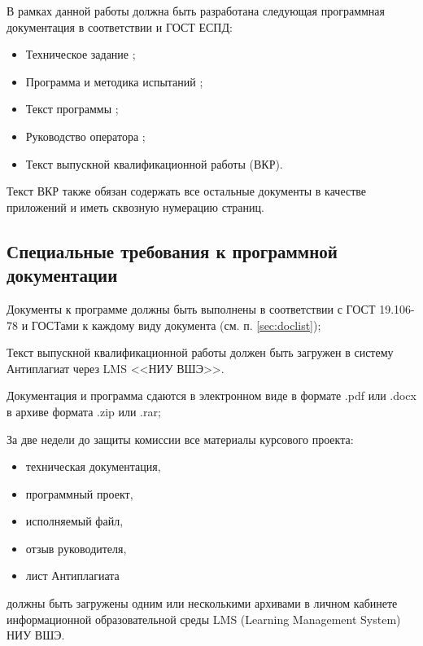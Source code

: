 \ifsmallfile\label{sec:doclist}\fi
В рамках данной работы должна быть разработана следующая программная документация в соответствии и ГОСТ ЕСПД:
\begin{itemize}
  \item Техническое задание \cite{gostTZ};
  \item Программа и методика испытаний \cite{gostPMI};
  \item Текст программы \cite{gostTP};
  \item Руководство оператора \cite{gostRO};
  \item Текст выпускной квалификационной работы (ВКР).
\end{itemize}

Текст ВКР также обязан содержать все остальные документы в качестве приложений и иметь сквозную нумерацию страниц.

\subsection{Специальные требования к программной документации}
Документы к программе должны быть выполнены в соответствии с ГОСТ 19.106-78 и ГОСТами к каждому виду документа
(см. п. \ref{sec:doclist});

Текст выпускной квалификационной работы должен быть загружен в систему Антиплагиат через LMS <<НИУ ВШЭ>>.

Документация и программа сдаются в электронном виде в формате .pdf или .docx в архиве формата .zip или .rar;

За две недели до защиты комиссии все материалы курсового проекта:
\begin{itemize}
  \item техническая документация,
  \item программный проект,
  \item исполняемый файл,
  \item отзыв руководителя,
  \item лист Антиплагиата
\end{itemize}
должны быть загружены одним или несколькими архивами в личном кабинете информационной образовательной среды LMS (Learning Management System) НИУ ВШЭ.


